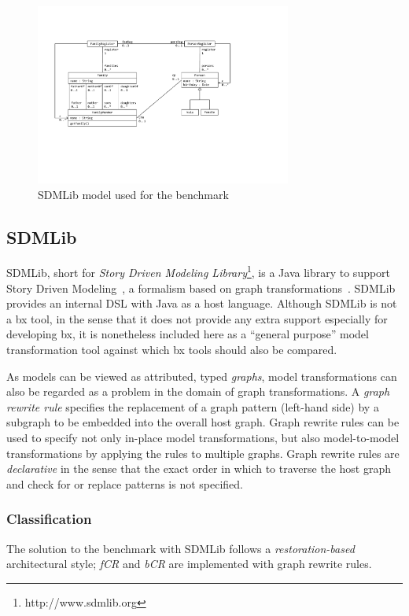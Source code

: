 

\begin{figure}[htb!]
	\centering
	\includegraphics[width=0.75\textwidth]{diagrams/solutions/SDMLibModel}
	\caption{SDMLib model used for the benchmark}
	\label{fig:SDMLibModel}
\end{figure}

\subsection{SDMLib}
\label{sec:SDMLib}

SDMLib, short for \emph{Story Driven Modeling Library}\footnote{http://www.sdmlib.org}, is a Java library to support Story Driven Modeling~\cite{Norbisrath2013}, a formalism based on graph transformations~\cite{Ehrig2006}.
SDMLib provides an internal DSL with Java as a host language.
Although SDMLib is not a bx tool, in the sense that it does not provide any extra support especially for developing bx, it is nonetheless included here as a ``general purpose'' model transformation tool against which bx tools should also be compared. 

As models can be viewed as attributed, typed \emph{graphs}, model transformations can also be regarded as a problem in the domain of graph transformations.
A \emph{graph rewrite rule} specifies the replacement of a graph pattern (left-hand side) by a subgraph to be embedded into the overall host graph.
Graph rewrite rules can be used to specify not only in-place model transformations, but also 
model-to-model transformations by applying the rules to multiple graphs.
Graph rewrite rules are \emph{declarative} in the sense that the exact order in which to traverse the host graph and check for or replace patterns is not specified.


\subsubsection{Classification}
The solution to the benchmark with SDMLib follows a \emph{restoration-based} architectural style; \emph{fCR} and \emph{bCR} are implemented with graph rewrite rules. 

